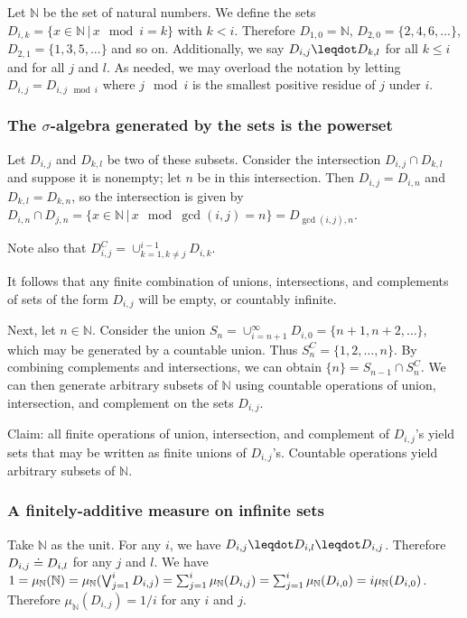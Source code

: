 \documentclass[10pt, onecolumn, nofootinbib]{revtex4-2}
\begin{document}
Let $\mathbb{N}$ be the set of natural numbers. We define the sets $D_{i,k} = \{ x \in \mathbb{N} \, | \, x \mod i = k \}$ with $k < i$. Therefore $D_{1,0} = \mathbb{N}$, $D_{2,0} = \{ 2, 4, 6, ... \}$, $D_{2,1} = \{ 1, 3, 5, ... \}$ and so on. Additionally, we say $D_{i,j} \finer D_{k,l}$ for all $k \leq i$ and for all $j$ and $l$. As needed, we may overload the notation by letting $D_{i,j} =  D_{i, j \mod i}$ where $j\mod i$ is the smallest positive residue of $j$ under $i$.

\subsubsection{The $\sigma$-algebra generated by the sets is the powerset}

Let $D_{i,j}$ and $D_{k,l}$ be two of these subsets. Consider the intersection $D_{i,j}\cap D_{k,l}$ and suppose it is nonempty; let $n$ be in this intersection. Then $D_{i,j} = D_{i,n}$ and $D_{k,l} = D_{k,n}$, so the intersection is given by $D_{i,n}\cap D_{j,n} = \{x\in \mathbb{N} \, | \, x \mod \gcd(i,j) = n\} = D_{\gcd(i,j),n}$. 

Note also that $D_{i,j}^C = \cup_{k=1,k\neq j}^{i-1}D_{i,k}$. 

It follows that any finite combination of unions, intersections, and complements of sets of the form $D_{i,j}$ will be empty, or countably infinite. 

Next, let $n\in\mathbb{N}$. Consider the union $S_n = \cup_{i=n+1}^{\infty}D_{i,0} = \{n+1,n+2,\ldots\}$, which may be generated by a countable union. Thus $S_n^C = \{1,2,\ldots,n\}$. By combining complements and intersections, we can obtain $\{n\} = S_{n-1}\cap S_n^C$. We can then generate arbitrary subsets of $\mathbb{N}$ using countable operations of union, intersection, and complement on the sets $D_{i,j}$. 

Claim: all finite operations of union, intersection, and complement of $D_{i,j}$'s yield sets that may be written as finite unions of $D_{i,j}$'s. Countable operations yield arbitrary subsets of $\mathbb{N}$. 

\subsubsection{A finitely-additive measure on infinite sets}

Take $\mathbb{N}$ as the unit. For any $i$, we have $D_{i,j} \finer D_{i,l} \finer D_{i,j}$. Therefore $D_{i,j} \doteq D_{i,l}$ for any $j$ and $l$. We have $1 = \mu_{\mathbb{N}}(\mathbb{N}) = \mu_{\mathbb{N}}(\bigvee_{j=1}^i D_{i,j}) = \sum_{j=1}^i \mu_{\mathbb{N}}( D_{i,j}) = \sum_{j=1}^i \mu_{\mathbb{N}}( D_{i,0}) = i \mu_{\mathbb{N}}( D_{i,0}) $. Therefore $\mu_{\mathbb{N}}( D_{i,j}) = 1/i$ for any $i$ and $j$.
\end{document}
